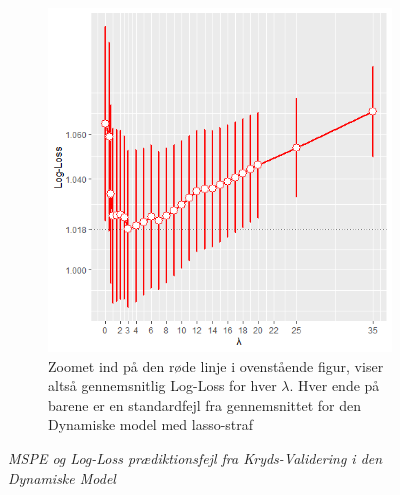 \documentclass[11pt,a4paper]{article}
\begin{document}
\begin{figure}[h!]
\begin{subfigure}[b]{0.425\linewidth}
    \includegraphics[width=\textwidth]{BARPLOTLOGALPHANY.png}
    \caption{Zoomet ind på den røde linje i ovenstående figur, viser altså gennemsnitlig Log-Loss for hver $\lambda$. Hver ende på barene er en standardfejl fra gennemsnittet for den Dynamiske model med lasso-straf}
    \label{fig:LogLossBarDyn}    
    \end{subfigure}
\caption{\textit{MSPE og Log-Loss prædiktionsfejl fra Kryds-Validering i den Dynamiske Model}}
  \label{fig:MSPELOGLOSDYN}
\end{figure}
\end{document}

